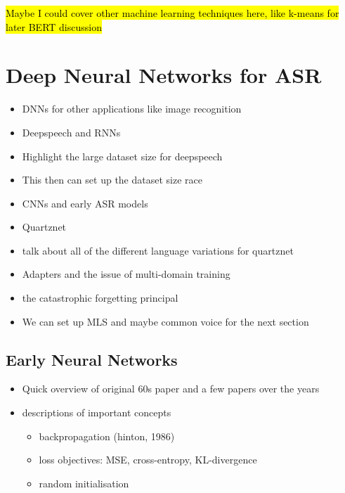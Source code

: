\hl{Maybe I could cover other machine learning techniques here, like k-means for later BERT discussion}



\section{Deep Neural Networks for ASR}
\begin{itemize}
    \item DNNs for other applications like image recognition
    \item Deepspeech and RNNs
    \item Highlight the large dataset size for deepspeech
    \item This then can set up the dataset size race
    \item CNNs and early ASR models
    \item Quartznet \cite{quartznet}
    \item talk about all of the different language variations for quartznet
    \item Adapters and the issue of multi-domain training
    \item the catastrophic forgetting principal
    \item We can set up MLS and maybe common voice for the next section
\end{itemize}

\subsection{Early Neural Networks}
\begin{itemize}
    \item Quick overview of original 60s paper and a few papers over the years
    \item descriptions of important concepts
    \begin{itemize}
        \item backpropagation (hinton, 1986) 
        \item loss objectives: MSE, cross-entropy, KL-divergence 
        \item random initialisation
    \end{itemize}
\end{itemize}



